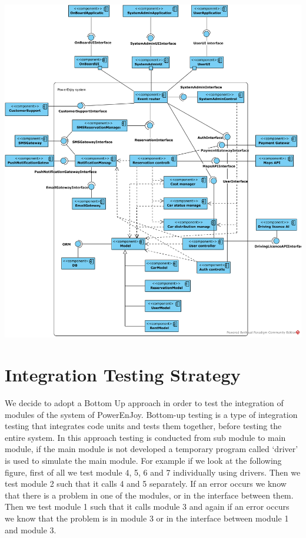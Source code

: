 \begin{minipage}{\textwidth}
\includegraphics[width=\textwidth, keepaspectratio]{../images/diagram/component_view.png}
\end{minipage}

\section{Integration Testing Strategy}
We decide to adopt a Bottom Up approach in order to test the integration of modules of the system of PowerEnJoy.
Bottom-up testing is a type of integration testing that integrates code units and tests them together, before testing the entire system.
In this approach testing is conducted from sub module to main module, if the main module is not developed a temporary program called ‘driver’ is used to simulate the main module.
For example if we look at the following figure, first of all we test module 4, 5, 6 and 7 individually using drivers.
Then we test module 2 such that it calls 4 and 5 separately.
If an error occurs we know that there is a problem in one of the modules, or in the interface between them.
Then we test module 1 such that it calls module 3 and again if an error occurs we know that the problem is in module 3 or in the interface between module 1 and module 3.

